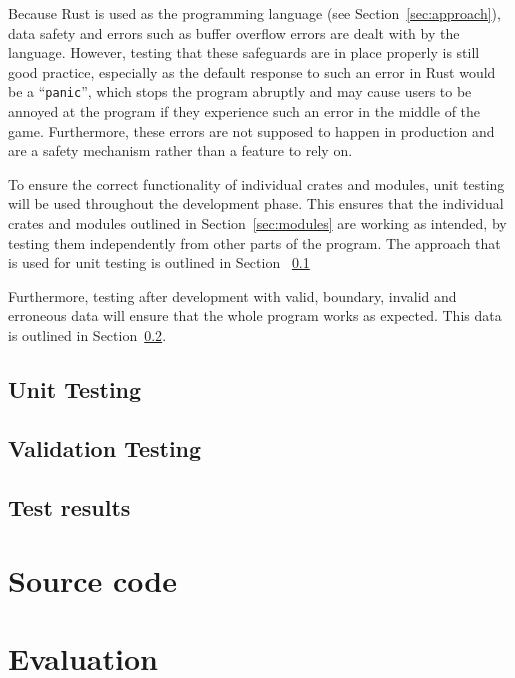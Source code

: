 \documentclass[11pt]{article}
\begin{document}
Because Rust is used as the programming language (see Section~\ref{sec:approach}), data safety
and errors such as buffer overflow errors are dealt with by the language. However, testing that
these safeguards are in place properly is still good practice, especially as the default response
to such an error in Rust would be a ``\texttt{panic}'', which stops the program abruptly and may
cause users to be annoyed at the program if they experience such an error in the middle of the game.
Furthermore, these errors are not supposed to happen in production and are a safety mechanism rather
than a feature to rely on.

To ensure the correct functionality of individual crates and modules, unit testing will be used throughout
the development phase. This ensures that the individual crates and modules outlined in Section~\ref{sec:modules}
are working as intended, by testing them independently from other parts of the program. The approach that is
used for unit testing is outlined in Section ~\ref{sec:unit-test}

Furthermore, testing after development with valid, boundary, invalid and erroneous data will ensure
that the whole program works as expected. This data is outlined in Section~\ref{sec:whole-test}.
\subsection{Unit Testing}
\label{sec:unit-test}
\subsection{Validation Testing}
\label{sec:whole-test}
\subsection{Test results}
\section{Source code}
\section{Evaluation}
\end{document}
